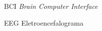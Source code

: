 \begin{siglas}
  \item[BCI] \textit{Brain Computer Interface}
  \item[EEG] Eletroencefalograma
  
\end{siglas}

